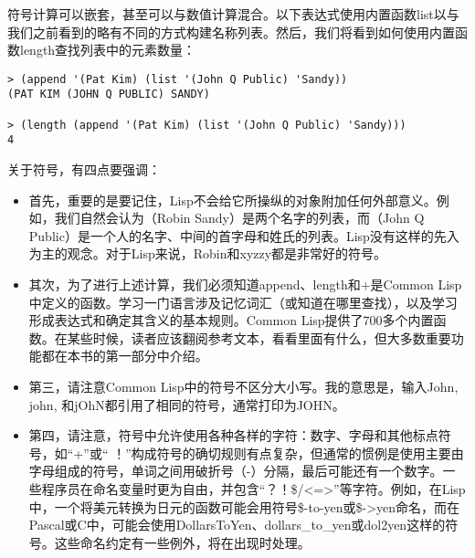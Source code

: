 符号计算可以嵌套，甚至可以与数值计算混合。以下表达式使用内置函数list以与我们之前看到的略有不同的方式构建名称列表。然后，我们将看到如何使用内置函数length查找列表中的元素数量：
\begin{lstlisting}[frame=shadowbox]
> (append '(Pat Kim) (list '(John Q Public) 'Sandy))
(PAT KIM (JOHN Q PUBLIC) SANDY)

> (length (append '(Pat Kim) (list '(John Q Public) 'Sandy)))
4
\end{lstlisting}

关于符号，有四点要强调：
\begin{itemize}
	\item 首先，重要的是要记住，Lisp不会给它所操纵的对象附加任何外部意义。例如，我们自然会认为（Robin Sandy）是两个名字的列表，而（John Q Public）是一个人的名字、中间的首字母和姓氏的列表。Lisp没有这样的先入为主的观念。对于Lisp来说，Robin和xyzzy都是非常好的符号。
	\item 其次，为了进行上述计算，我们必须知道append、length和+是Common Lisp中定义的函数。学习一门语言涉及记忆词汇（或知道在哪里查找），以及学习形成表达式和确定其含义的基本规则。Common Lisp提供了700多个内置函数。在某些时候，读者应该翻阅参考文本，看看里面有什么，但大多数重要功能都在本书的第一部分中介绍。
	\item 第三，请注意Common Lisp中的符号不区分大小写。我的意思是，输入John, john, 和jOhN都引用了相同的符号，通常打印为JOHN。
	\item 第四，请注意，符号中允许使用各种各样的字符：数字、字母和其他标点符号，如“+”或“ ！”构成符号的确切规则有点复杂，但通常的惯例是使用主要由字母组成的符号，单词之间用破折号（-）分隔，最后可能还有一个数字。一些程序员在命名变量时更为自由，并包含“？！\$/<=>”等字符。例如，在Lisp中，一个将美元转换为日元的函数可能会用符号\$-to-yen或\$->yen命名，而在Pascal或C中，可能会使用DollarsToYen、dollars\_to\_yen或dol2yen这样的符号。这些命名约定有一些例外，将在出现时处理。
\end{itemize}